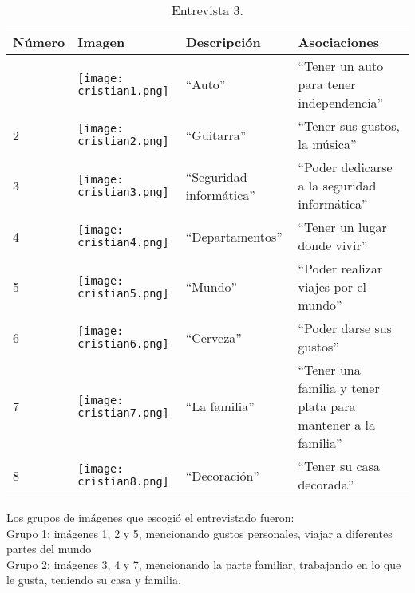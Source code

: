 \begin{table}[H]
\centering
\begin{tabular}{>{\centering\arraybackslash}m{1cm} >{\centering\arraybackslash}m{2cm} >{\arraybackslash}m{5cm}>{\arraybackslash}m{5cm}}
\hline
Número  & Imagen & Descripción & Asociaciones \\
\hline \hline

1 & \texttt{[image: cristian1.png]} & ``Auto'' & ``Tener un auto para tener independencia'' \\
\hline

2 & \texttt{[image: cristian2.png]} & ``Guitarra'' & ``Tener sus gustos, la música'' \\
\hline

3 & \texttt{[image: cristian3.png]} & ``Seguridad informática'' & ``Poder dedicarse a la seguridad informática'' \\
\hline

4 & \texttt{[image: cristian4.png]} & ``Departamentos'' & ``Tener un lugar donde vivir'' \\
\hline

5 & \texttt{[image: cristian5.png]} & ``Mundo'' & ``Poder realizar viajes por el mundo''\\
\hline

6 & \texttt{[image: cristian6.png]} & ``Cerveza'' & ``Poder darse sus gustos''\\
\hline

7 & \texttt{[image: cristian7.png]} & ``La familia'' & ``Tener una familia y tener plata para mantener a la familia'' \\
\hline

8 & \texttt{[image: cristian8.png]} & ``Decoración'' & ``Tener su casa decorada''\\
\hline

\end{tabular}
\caption{Entrevista 3.}
\label{tabla:cristian}
\end{table}

Los grupos de imágenes que escogió el entrevistado fueron:\\

Grupo 1: imágenes 1, 2 y 5, mencionando gustos personales, viajar a diferentes partes del mundo \\

Grupo 2: imágenes 3, 4 y 7, mencionando la parte familiar, trabajando en lo que le gusta, teniendo su casa y familia.\\

